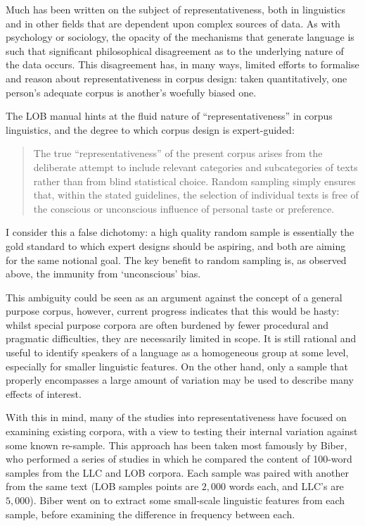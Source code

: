 Much has been written on the subject of representativeness\cite{biber1993using,varadi2001linguistic,varadi2000corpus,leech1992corpora,rapp2014using}, both in linguistics and in other fields that are dependent upon complex sources of data.  As with psychology or sociology, the opacity of the mechanisms that generate language is such that significant philosophical disagreement as to the underlying nature of the data occurs.  This disagreement has, in many ways, limited efforts to formalise and reason about representativeness in corpus design: taken quantitatively, one person's adequate corpus is another's woefully biased one.

The LOB manual hints at the fluid nature of ``representativeness'' in corpus linguistics, and the degree to which corpus design is expert-guided\cite{johansson1986tagged}:
\begin{quote}
The true “representativeness” of the present corpus arises from the deliberate attempt to include relevant categories and subcategories of texts rather than from blind statistical choice. Random sampling simply ensures that, within the stated guidelines, the selection of individual texts is free of the conscious or unconscious influence of personal taste or preference.
\end{quote}

I consider this a false dichotomy: a high quality random sample is essentially the gold standard to which expert designs should be aspiring, and both are aiming for the same notional goal.  The key benefit to random sampling is, as observed above, the immunity from `unconscious' bias\cite{barnett1991sample}. %

This ambiguity could be seen as an argument against the concept of a general purpose corpus, however, current progress indicates that this would be hasty: whilst special purpose corpora are often burdened by fewer procedural and pragmatic difficulties, they are necessarily limited in scope.  It is still rational and useful to identify speakers of a language as a homogeneous group at some level, especially for smaller linguistic features.  On the other hand, only a sample that properly encompasses a large amount of variation may be used to describe many effects of interest.

With this in mind, many of the studies into representativeness have focused on examining existing corpora, with a view to testing their internal variation against some known re-sample.  This approach has been taken most famously by Biber\cite{biber1993representativeness}, who performed a series of studies in which he compared the content of 100-word samples from the LLC and LOB corpora.  Each sample was paired with another from the same text (LOB samples points are $2,000$ words each, and LLC's are $5,000$).  Biber went on to extract some small-scale linguistic features from each sample, before examining the difference in frequency between each.

